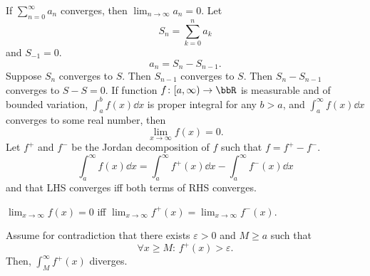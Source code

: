 If $\sum_{n=0}^{\infty}a_n$ converges, then $\lim_{n\to\infty}a_n=0$.
\bpr
Let
\[S_n=\sum_{k=0}^na_k\]
and $S_{-1}=0$.
\[a_n=S_n-S_{n-1}.\]
Suppose $S_n$ converges to $S$. Then $S_{n-1}$ converges to $S$. Then $S_n-S_{n-1}$ converges to $S-S=0$.
\epr
{}
If function $f\colon [a,\infty)\to\bbR$ is measurable and of bounded variation, $\int_a^bf(x)\dd{x}$ is proper integral for any $b>a$, and $\int_a^{\infty}f(x)\dd{x}$ converges to some real number, then
\[\lim_{x\to\infty}f(x)=0.\]
\bpr
Let $f^+$ and $f^-$ be the Jordan decomposition of $f$ such that $f=f^+-f^-$.
\[\int_a^{\infty}f(x)\dd{x}=\int_a^{\infty}f^+(x)\dd{x}-\int_a^{\infty}f^-(x)\dd{x}\]
and that LHS converges iff both terms of RHS converges.

$\lim_{x\to\infty}f(x)=0$ iff $\lim_{x\to\infty}f^+(x)=\lim_{x\to\infty}f^-(x)$.

Assume for contradiction that there exists $\varepsilon>0$ and $M\geq a$ such that
\[\forall x\geq M:\,f^+(x)>\varepsilon.\]
Then, $\int_M^{\infty}f^+(x)$ diverges.

